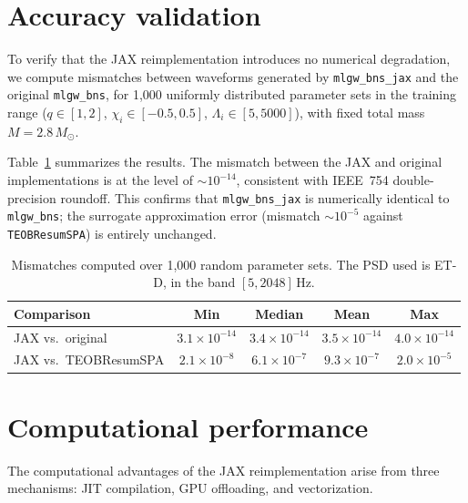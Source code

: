 \documentclass[twocolumn,superscriptaddress,nofootinbib,aps,prd]{revtex4-2}
\begin{document}
\section{Accuracy validation}
\label{sec:accuracy}

To verify that the JAX reimplementation introduces no numerical degradation,
we compute mismatches between waveforms generated by \texttt{mlgw\_bns\_jax}
and the original \texttt{mlgw\_bns}, for 1,000 uniformly distributed
parameter sets in the training range ($q \in [1,2]$, $\chi_i \in [-0.5,
0.5]$, $\Lambda_i \in [5, 5000]$), with fixed total mass $M = 2.8\,M_\odot$.

Table~\ref{tab:mismatches} summarizes the results.  The mismatch between the
JAX and original implementations is at the level of $\sim\!10^{-14}$,
consistent with IEEE~754 double-precision roundoff.  This confirms that
\texttt{mlgw\_bns\_jax} is numerically identical to \texttt{mlgw\_bns}; the
surrogate approximation error (mismatch $\sim\!10^{-5}$ against
\texttt{TEOBResumSPA}) is entirely unchanged.

\begin{table}[t]
\caption{Mismatches computed over 1,000 random parameter sets.  The PSD used
is ET-D, in the band $[5, 2048]$\,Hz.}
\label{tab:mismatches}
\begin{ruledtabular}
\begin{tabular}{lcccc}
 Comparison & Min & Median & Mean & Max \\
\hline
JAX vs.\ original & $3.1{\times}10^{-14}$ & $3.4{\times}10^{-14}$
   & $3.5{\times}10^{-14}$ & $4.0{\times}10^{-14}$ \\
JAX vs.\ TEOBResumSPA & $2.1{\times}10^{-8}$ & $6.1{\times}10^{-7}$
   & $9.3{\times}10^{-7}$ & $2.0{\times}10^{-5}$ \\
\end{tabular}
\end{ruledtabular}
\end{table}


\section{Computational performance}
\label{sec:speed}

The computational advantages of the JAX reimplementation arise from three
mechanisms: JIT compilation, GPU offloading, and vectorization.
\end{document}
